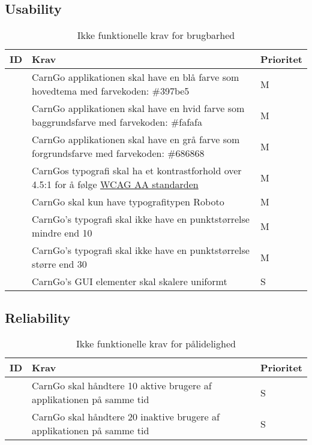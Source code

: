 \documentclass[Kravspecifikation/Kravspec_Main.tex]{subfiles}
\begin{document}
\subsection{Usability}
\begin{table}[H]
\centering
\begin{tabular}{|L{0.1\textwidth}|L{0.6\textwidth}|L{0.15\textwidth}|}
\hline
\textbf{ID} & \textbf{Krav} & \textbf{Prioritet} \\ \hline
\subreq{} & CarnGo applikationen skal have en blå farve som hovedtema med farvekoden: \#397be5 & M \\ \hline
\subreq{} & CarnGo applikationen skal have en hvid farve som baggrundsfarve med farvekoden: \#fafafa & M \\ \hline
\subreq{} & CarnGo applikationen skal have en grå farve som forgrundsfarve med farvekoden: \#686868 & M \\ \hline
\subreq{} & CarnGos typografi skal ha et kontrastforhold over 4.5:1 for å følge  \href{https://www.w3.org/TR/UNDERSTANDING-WCAG20/conformance.html#uc-levels-head}{WCAG AA standarden} & M \\ \hline
\subreq{} & CarnGo skal kun have typografitypen Roboto & M \\ \hline
\subreq{} & CarnGo's typografi skal ikke have en punktstørrelse mindre end 10 & M \\ \hline
\subreq{} & CarnGo's typografi skal ikke have en punktstørrelse større end 30 & M \\ \hline
\subreq{} & CarnGo's GUI elementer skal skalere uniformt & S \\ \hline
\end{tabular}
\caption{Ikke funktionelle krav for brugbarhed}
\label{tab:brugbarhed}
\end{table}


\subsection{Reliability}
\begin{table}[H]
\centering
\begin{tabular}{|L{0.1\textwidth}|L{0.6\textwidth}|L{0.15\textwidth}|}
\hline
\textbf{ID} & \textbf{Krav} & \textbf{Prioritet} \\ \hline
\subreq{} & CarnGo skal håndtere 10 aktive brugere af applikationen på samme tid & S \\ \hline
\subreq{} & CarnGo skal håndtere 20 inaktive brugere af applikationen på samme tid & S \\ \hline
\end{tabular}
\caption{Ikke funktionelle krav for pålidelighed}
\label{tab:pålidelighed}
\end{table}
\end{document}
